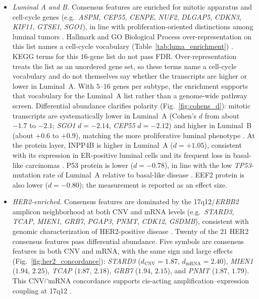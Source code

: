 \documentclass[lettersize,journal]{IEEEtran}
\begin{document}
\begin{itemize}
    \item \textit{Luminal A and B.}
    Consensus features are enriched for mitotic apparatus and cell-cycle genes
    (e.g.\ \textit{ASPM}, \textit{CEP55}, \textit{CENPE}, \textit{NUF2}, \textit{DLGAP5}, \textit{CDKN3}, \textit{KIF11},
    \textit{GTSE1}, \textit{SGO1}), in line with proliferation-oriented distinctions among luminal tumors
    \cite{Gao2018LuminalA,Ades2014LuminalB,PerezPena2017MitoticLumA,Ibrahim2024ASPM}.
    Hallmark and GO Biological Process over-representation on this list names a cell-cycle vocabulary (Table~\ref{tab:luma_enrichment}) \cite{Malorni2016RBsig,Liberzon2015Hallmark}.
    KEGG terms for this $16$-gene list do not pass FDR.
    Over-representation treats the list as an unordered gene set, so these terms name a cell-cycle vocabulary and do not themselves say whether the transcripts are higher or lower in Luminal~A.
    With $5$--$16$ genes per subtype, the enrichment supports that vocabulary for the Luminal~A list rather than a genome-wide pathway screen.
    Differential abundance clarifies polarity (Fig.~\ref{fig:cohens_d}): mitotic transcripts are systematically lower in Luminal~A
    (Cohen's $d$ from about $-1.7$ to $-2.1$; \textit{SGO1} $d=-2.14$, \textit{CEP55} $d=-2.12$) and higher in Luminal~B
    (about $+0.6$ to $+0.9$), matching the more proliferative luminal phenotype
    \cite{Ades2014LuminalB}.
    At the protein layer, INPP4B is higher in Luminal~A ($d=+1.05$), consistent with its expression in ER-positive luminal cells and its frequent loss in basal-like carcinomas \cite{Fedele2010INPP4B,Gewinner2009INPP4B}.
    P53 protein is lower ($d=-0.78$), in line with the low \textit{TP53}-mutation rate of Luminal~A relative to basal-like disease \cite{Koboldt2012BRCA}.
    EEF2 protein is also lower ($d=-0.80$); the measurement is reported as an effect size.

    \item \textit{HER2-enriched.}
    Consensus features are dominated by the 17q12/\textit{ERBB2} amplicon neighborhood at both CNV and mRNA levels
    (e.g.\ \textit{STARD3}, \textit{TCAP}, \textit{MIEN1}, \textit{GRB7}, \textit{PGAP3}, \textit{PNMT}, \textit{CDK12}, \textit{GSDMB}),
    consistent with genomic characterization of HER2-positive disease
    \cite{Staaf2010HER2,Kao2006Amplicon,Sahlberg2013HER2Amplicon}.
    Twenty of the $21$ HER2 consensus features pass differential abundance.
    Five symbols are consensus features in both CNV and mRNA, with the same sign and large effects
    (Fig.~\ref{fig:her2_concordance}): \textit{STARD3} ($d_{\mathrm{CNV}}=1.87$, $d_{\mathrm{mRNA}}=2.40$),
    \textit{MIEN1} ($1.94$, $2.25$), \textit{TCAP} ($1.87$, $2.18$), \textit{GRB7} ($1.94$, $2.15$), and \textit{PNMT} ($1.87$, $1.79$).
    This CNV$\cap$mRNA concordance supports cis-acting amplification--expression coupling at 17q12 \cite{Pollack2002Cis,Staaf2010HER2,Kao2006Amplicon}.


\end{itemize}
\end{document}
